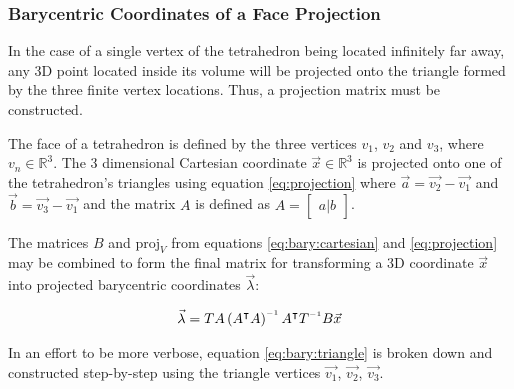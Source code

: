 \subsubsection{Barycentric Coordinates of a Face Projection}

In the case of a single vertex of the tetrahedron being  located  infinitely far
away, any 3D point located inside its volume will be projected onto the triangle
formed  by the three finite vertex locations. Thus, a projection matrix must  be
constructed.

The face of a  tetrahedron  is  defined  by  the three vertices $v_1$, $v_2$ and
$v_3$,  where  $v_n \in \mathbb{R}^3$. The 3  dimensional  Cartesian  coordinate
$\vec{x}\in\mathbb{R}^3$  is  projected  onto one of the tetrahedron's triangles
using equation \ref{eq:projection} where $\vec{a}  =  \vec{v_2}  - \vec{v_1}$
and  $\vec{b} = \vec{v_3}  -  \vec{v_1}$  and  the  matrix  $A$  is  defined  as
$A=\begin{bmatrix} a|b \end{bmatrix}$.

The matrices $B$ and $\text{proj}_V$ from equations \ref{eq:bary:cartesian}  and
\ref{eq:projection} may be combined to form the final matrix  for transforming a
3D coordinate $\vec{x}$ into projected
barycentric coordinates $\vec{\lambda}$:

\begin{align}
    \label{eq:bary:triangle}
    \vec{\lambda} = TA\left(A\transpose A\right)\inverse A\transpose T\inverse B \vec{x}
\end{align}

In  an effort to be more verbose, equation \ref{eq:bary:triangle} is broken down
and   constructed   step-by-step   using  the  triangle  vertices   $\vec{v_1}$,
$\vec{v_2}$, $\vec{v_3}$.

